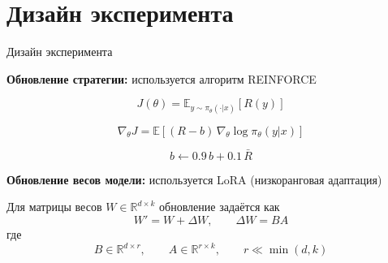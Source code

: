 \section{Дизайн эксперимента}
\begin{frame}{Дизайн эксперимента}
\small

\textbf{Обновление стратегии:} используется алгоритм REINFORCE

\[
J(\theta)=\mathbb{E}_{y\sim \pi_\theta(\cdot|x)}[R(y)]
\]

\[
\nabla_\theta J = \mathbb{E}\left[(R - b)\,\nabla_\theta \log \pi_\theta(y|x)\right]
\]

\[
b \leftarrow 0.9\,b + 0.1\,\bar{R}
\]

\vspace{0.2cm}
\textbf{Обновление весов модели:} используется LoRA (низкоранговая адаптация)

Для матрицы весов $W \in \mathbb{R}^{d \times k}$ обновление задаётся как
\[
W' = W + \Delta W, \qquad \Delta W = BA
\]
где
\[
B \in \mathbb{R}^{d \times r}, \qquad A \in \mathbb{R}^{r \times k}, \qquad r \ll \min(d,k)
\]
\end{frame}

